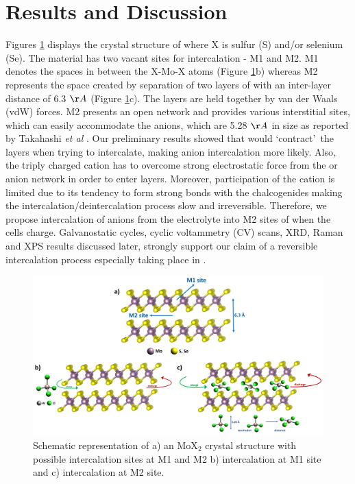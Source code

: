 \section{Results and Discussion}
Figures \ref{Figures/chap4fig:crys} displays the crystal structure of  where X is sulfur (S) and/or selenium (Se). The material has two vacant sites for intercalation - M1 and M2. M1 denotes the spaces in between the X-Mo-X atoms (Figure \ref{Figures/chap4fig:crys}b) whereas M2 represents the space created by separation of two layers of  with an inter-layer distance of 6.3 $\AA$ (Figure \ref{Figures/chap4fig:crys}c). The layers are held together by van der Waals (vdW) forces. M2 presents an open network and provides various interstitial sites, which can easily accommodate the  anions, which are 5.28 $\AA$ in size as reported by Takahashi {\it et al} \cite{takahashi_niv2o5nh2o_2005}. Our preliminary results showed that  would \lq contract\rq\ the  layers when trying to intercalate, making  anion intercalation more likely. Also, the triply charged  cation has to overcome strong electrostatic force from the  or  anion network in order to enter  layers. Moreover, participation of the cation is limited due to its tendency to form strong bonds with the chalcogenides making the intercalation/deintercalation process slow and irreversible. Therefore, we propose intercalation of  anions from the electrolyte into M2 sites of  when the cells charge. Galvanostatic cycles, cyclic voltammetry (CV) scans, XRD, Raman and XPS results discussed later, strongly support our claim of a reversible intercalation process especially taking place in  . 
\begin{figure}[htb!]
\centering
\includegraphics[width=\textwidth]{Figures/chap4fig/crys}
\caption{Schematic representation of a) an MoX$_2$ crystal structure with possible intercalation sites at M1 and M2 b) intercalation at M1 site and c) intercalation at M2 site.}
 \label{Figures/chap4fig:crys}
\end{figure}
